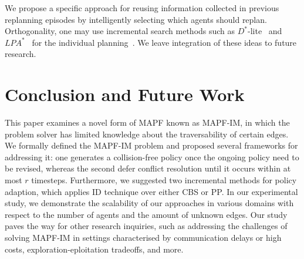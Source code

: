\documentclass[letterpaper]{article} %
\def\
UrlFont{\rm}  %
\newcommand{\roni}[1]{\textbf{[\color{orange}RONI:#1]}}
\theoremstyle{definition}
\begin{document}

We propose a specific approach for reusing information collected in previous replanning episodes by intelligently selecting which agents should replan. Orthogonality, one may use incremental search methods such as $D^*$-lite~\cite{koenig2002d} and $LPA^*$~\cite{koenig2004lifelong} for the individual planning~\cite{boyarski2021iterative}. We leave integration of these ideas to future research.





\section{Conclusion and Future Work}

This paper examines a novel form of MAPF known as MAPF-IM, in which the problem solver has limited knowledge about the traversability of certain edges. We formally defined the MAPF-IM problem and proposed several frameworks for addressing it: one generates a collision-free policy once the ongoing policy need to be revised, whereas the second defer conflict resolution until it occurs within at most $r$ timesteps. Furthermore, we suggested two incremental methods for policy adaption, which applies ID technique over either CBS or PP. In our experimental study, we demonstrate the scalability of our approaches in various domains with respect to the number of agents and the amount of unknown edges. Our study paves the way for other research inquiries, such as addressing the challenges of solving MAPF-IM in settings characterised by communication delays or high costs, exploration-eploitation tradeoffs, and more.


\end{document}
